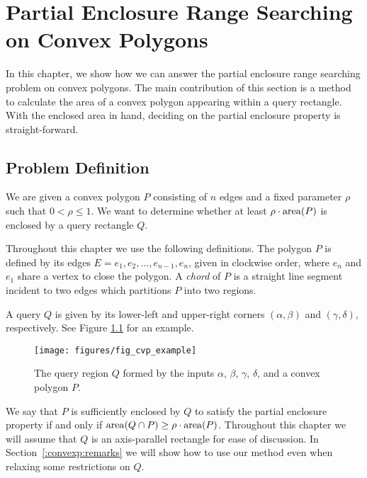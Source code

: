 \chapter{Partial Enclosure Range Searching on Convex Polygons}
\label{:convexp}

In this chapter, we show how we can answer the partial enclosure range searching problem on convex polygons. 
The main contribution of this section is a method to calculate the area of a convex polygon appearing within a query rectangle. 
With the enclosed area in hand, deciding on the partial enclosure property is straight-forward.


\section{Problem Definition}
\label{:convexp:problem-definition}

\begin{problem}
We are given a convex polygon $P$ consisting of $n$ edges and a fixed parameter $\rho$ such that $0 < \rho \leq 1$. We want to determine whether at least $\rho \cdot \operatorname{area}\!\left(P\right)$ is enclosed by a query rectangle $Q$.
\end{problem}

Throughout this chapter we use the following definitions. The polygon $P$ is defined by its edges $E = e_1, e_2, \ldots, e_{n-1}, e_n$, given in clockwise order, where $e_n$ and $e_1$ share a vertex to close the polygon.  A \emph{chord} of $P$ is a straight line segment incident to two edges which partitions $P$ into two regions.

A query $Q$ is given by its lower-left and upper-right corners $(\alpha, \beta)$ and $(\gamma, \delta)$, respectively. See Figure \ref{fig:convexp:example} for an example.

\begin{figure}[t]
\begin{center}
  \texttt{[image: figures/fig\_cvp\_example]}
  \caption[A convex polygon $P$ and query box $Q$.]{The query region $Q$ formed by the inputs $\alpha$, $\beta$, $\gamma$,  $\delta$, and a convex polygon $P$.}
  \label{fig:convexp:example}
\end{center}
\end{figure}

We say that $P$ is sufficiently enclosed by $Q$ to satisfy the partial enclosure property if and only if $\operatorname{area}\!\left(Q \cap P\right) \geq \rho \cdot \operatorname{area}\!\left(P\right)$. 
Throughout this chapter we will assume that $Q$ is an axis-parallel rectangle for ease of discussion. 
In Section~\ref{:convexp:remarks} we will show how to use our method even when relaxing some restrictions on $Q$.

